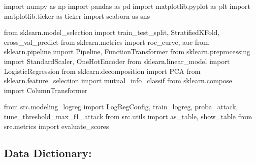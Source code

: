 \documentclass[
  letterpaper,
  DIV=11,
  numbers=noendperiod]{scrartcl}
\newenvironment{Shaded}{\begin{snugshade}}{\end{snugshade}}
\newcommand{\ImportTok}[1]{\textcolor[rgb]{0.00,0.46,0.62}{#1}}
\newcommand{\NormalTok}[1]{\textcolor[rgb]{0.00,0.23,0.31}{#1}}
\begin{document}
\begin{Shaded}
\begin{Highlighting}[]
\ImportTok{import}\NormalTok{ numpy }\ImportTok{as}\NormalTok{ np}
\ImportTok{import}\NormalTok{ pandas }\ImportTok{as}\NormalTok{ pd}
\ImportTok{import}\NormalTok{ matplotlib.pyplot }\ImportTok{as}\NormalTok{ plt}
\ImportTok{import}\NormalTok{ matplotlib.ticker }\ImportTok{as}\NormalTok{ ticker}
\ImportTok{import}\NormalTok{ seaborn }\ImportTok{as}\NormalTok{ sns}

\ImportTok{from}\NormalTok{ sklearn.model\_selection }\ImportTok{import}\NormalTok{ train\_test\_split, StratifiedKFold, cross\_val\_predict}
\ImportTok{from}\NormalTok{ sklearn.metrics }\ImportTok{import}\NormalTok{ roc\_curve, auc}
\ImportTok{from}\NormalTok{ sklearn.pipeline }\ImportTok{import}\NormalTok{ Pipeline, FunctionTransformer}
\ImportTok{from}\NormalTok{ sklearn.preprocessing }\ImportTok{import}\NormalTok{ StandardScaler, OneHotEncoder}
\ImportTok{from}\NormalTok{ sklearn.linear\_model }\ImportTok{import}\NormalTok{ LogisticRegression}
\ImportTok{from}\NormalTok{ sklearn.decomposition }\ImportTok{import}\NormalTok{ PCA}
\ImportTok{from}\NormalTok{ sklearn.feature\_selection }\ImportTok{import}\NormalTok{ mutual\_info\_classif}
\ImportTok{from}\NormalTok{ sklearn.compose }\ImportTok{import}\NormalTok{ ColumnTransformer}

\ImportTok{from}\NormalTok{ src.modeling\_logreg }\ImportTok{import}\NormalTok{ LogRegConfig, train\_logreg, proba\_attack, tune\_threshold\_max\_f1\_attack}
\ImportTok{from}\NormalTok{ src.utils }\ImportTok{import}\NormalTok{ as\_table, show\_table}
\ImportTok{from}\NormalTok{ src.metrics }\ImportTok{import}\NormalTok{ evaluate\_scores}
\end{Highlighting}
\end{Shaded}

\subsection{Data Dictionary:}\label{data-dictionary}
\end{document}
